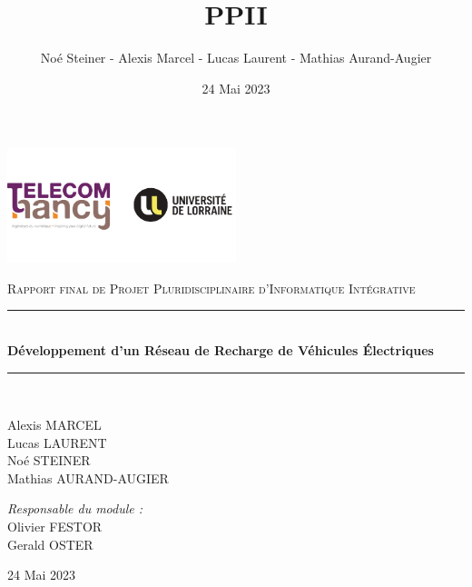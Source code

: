 \documentclass[french,a4paper]{article}
\title{PPII}
\author{Noé Steiner - Alexis Marcel - Lucas Laurent - Mathias Aurand-Augier}
\date{24 Mai 2023}
\newcommand{\HRule}{\rule{\linewidth}{0.5mm}}
\begin{document}

\begin{titlepage}
    \begin{center}

        \includegraphics[width=0.5\textwidth]{tele_univ.png}

        \textsc{\Large Rapport final de Projet Pluridisciplinaire d'Informatique Intégrative}\\[1.5cm]

        \HRule \\[0.4cm]
        { \huge \bfseries Développement d'un Réseau de Recharge de Véhicules Électriques\\[0.4cm] }

        \HRule \\[2cm]

        \begin{minipage}{0.4\textwidth}
            \begin{flushleft} \large
                Alexis MARCEL\\
                Lucas LAURENT\\
                Noé STEINER\\
                Mathias AURAND-AUGIER\\
            \end{flushleft}
        \end{minipage}
        \begin{minipage}{0.4\textwidth}
            \begin{flushright} \large
                \emph{Responsable du module :}\\
                Olivier FESTOR\\
                Gerald OSTER\\
            \end{flushright}
        \end{minipage}

        \vfill

        {\large 24 Mai 2023}

    \end{center}
\end{titlepage}
\newpage
\tableofcontents
\newpage
\end{document}
